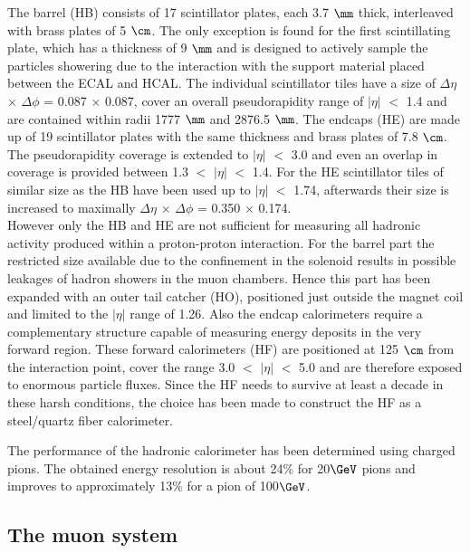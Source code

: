 The barrel (HB) consists of 17 scintillator plates, each 3.7 $\mm$ thick, interleaved with brass plates of 5 $\cm$. The only exception is found for the first scintillating plate, which has a thickness of 9 $\mm$ and is designed to actively sample the particles showering due to the interaction with the support material placed between the ECAL and HCAL. The individual scintillator tiles have a size of $\Delta \eta$ $\times$ $\Delta \phi$ = 0.087 $\times$ 0.087, cover an overall pseudorapidity range of $\vert \eta \vert$ $<$ 1.4 and are contained within radii 1777 $\mm$ and 2876.5 $\mm$. The endcaps (HE) are made up of 19 scintillator plates with the same thickness and brass plates of 7.8 $\cm$. The pseudorapidity coverage is extended to $\vert \eta \vert$ $<$ 3.0 and even an overlap in coverage is provided between 1.3 $<$ $\vert \eta \vert$ $<$ 1.4. For the HE scintillator tiles of similar size as the HB have been used up to $\vert \eta \vert$ $<$ 1.74, afterwards their size is increased to maximally $\Delta \eta$ $\times$ $\Delta \phi$ = 0.350 $\times$ 0.174.
\\
However only the HB and HE are not sufficient for measuring all hadronic activity produced within a proton-proton interaction. 
For the barrel part the restricted size available due to the confinement in the solenoid results in possible leakages of hadron showers in the muon chambers.
Hence this part has been expanded with an outer tail catcher (HO), positioned just outside the magnet coil and limited to the $\vert \eta \vert$ range of 1.26. Also the endcap calorimeters require a complementary structure capable of measuring energy deposits in the very forward region. These forward calorimeters (HF) are positioned at 125 $\cm$ from the interaction point, cover the range 3.0 $<$ $\vert \eta \vert$ $<$ 5.0 and are therefore exposed to enormous particle fluxes. Since the HF needs to survive at least a decade in these harsh conditions, the choice has been made to construct the HF as a steel/quartz fiber calorimeter.

The performance of the hadronic calorimeter has been determined using charged pions. The obtained energy resolution is about 24$\%$ for 20$\GeV$ pions and improves to approximately 13$\%$ for a pion of 100$\GeV$.

\subsection{The muon system}\label{sec::MuonChamber}

